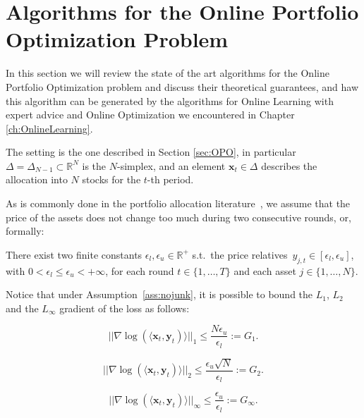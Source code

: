 \chapter{Algorithms for the Online Portfolio Optimization Problem}\label{ch:algos}

In this section we will review the state of the art algorithms for the Online Portfolio Optimization problem and discuss their theoretical guarantees, and haw this algorithm can be generated by the algorithms for Online Learning with expert advice and Online Optimization we encountered in Chapter \ref{ch:OnlineLearning}.

The setting is the one described in Section \ref{sec:OPO}, in particular $\Delta=\Delta_{N-1}\subset \mathbb R^N$ is the $N$-simplex, and an element $\mathbf x_t\in\Delta$ describes the allocation into $N$ stocks for the $t$-th period.

As is commonly done in the portfolio allocation literature~\cite{agarwal2006algorithms}, we assume that the price of the assets does not change too much during two consecutive rounds, or, formally:

\begin{assumption} \label{ass:nojunk}
     There exist two finite constants $\epsilon_l, \epsilon_u \in \mathbb{R}^+$ s.t.~the price relatives~$y_{j,t} \in [\epsilon_l, \epsilon_u]$, with $0 < \epsilon_l \leq \epsilon_u < +\infty$, for each round $t \in \{ 1, \ldots, T \}$ and each asset $j \in \{1, \ldots, N \}$.
\end{assumption}

Notice that under Assumption~\ref{ass:nojunk}, it is possible to bound the $L_1$, $L_2$ and the $L_\infty$ gradient of the loss as follows:

\begin{equation} \label{eq:bounded_gradient}
    ||\nabla \log (\langle \mathbf{x}_t, \mathbf{y}_t) \rangle||_1 \leq \frac{N\epsilon_u}{\epsilon_l}:=G_1.
\end{equation}

\begin{equation} \label{eq:bounded_gradient}
    ||\nabla \log (\langle \mathbf{x}_t, \mathbf{y}_t) \rangle||_2 \leq \frac{\epsilon_u \sqrt{N}}{\epsilon_l}:=G_2.
\end{equation}

\begin{equation} \label{eq:bounded_gradient}
    ||\nabla \log (\langle \mathbf{x}_t, \mathbf{y}_t) \rangle||_\infty \leq \frac{\epsilon_u }{\epsilon_l}:=G_\infty.
\end{equation}

